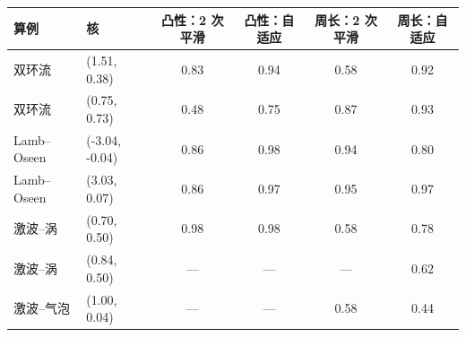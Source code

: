 \begin{tabular}{llcccc}\toprule 算例 & 核 & 凸性：2 次平滑 & 凸性：自适应 & 周长：2 次平滑 & 周长：自适应\\\midrule
双环流 & (1.51, 0.38) & 0.83 & 0.94 & 0.58 & 0.92\\
双环流 & (0.75, 0.73) & 0.48 & 0.75 & 0.87 & 0.93\\
Lamb–Oseen & (-3.04, -0.04) & 0.86 & 0.98 & 0.94 & 0.80\\
Lamb–Oseen & (3.03, 0.07) & 0.86 & 0.97 & 0.95 & 0.97\\
激波–涡 & (0.70, 0.50) & 0.98 & 0.98 & 0.58 & 0.78\\
激波–涡 & (0.84, 0.50) & — & — & — & 0.62\\
激波–气泡 & (1.00, 0.04) & — & — & 0.58 & 0.44\\
\bottomrule\end{tabular}